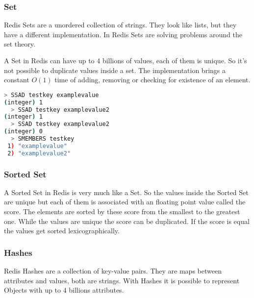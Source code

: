 \subsubsection{Set}
Redis Sets are a unordered collection of strings. They look like lists, but they have a different implementation. In Redis Sets are solving problems around the set theory.\cite{das2015learning} 

A Set in Redis can have up to 4 billions of values, each of them is unique. So it's not possible to duplicate values inside a set. The implementation brings a constant $O(1)$ time of adding, removing or checking for existence of an element.\cite{RedisSets}

\begin{lstlisting}[language=bash]
  > SSAD testkey examplevalue
(integer) 1
  > SSAD testkey examplevalue2
(integer) 1 
  > SSAD testkey examplevalue2
(integer) 0  
  > SMEMBERS testkey
 1) "examplevalue"
 2) "examplevalue2"
\end{lstlisting}

\subsubsection{Sorted Set}
A Sorted Set in Redis is very much like a Set. So the values inside the Sorted Set are unique but each of them is associated with an floating point value called the score. The elements are sorted by these score from the smallest to the greatest one. While the values are unique the score can be duplicated. If the score is equal the values get sorted lexicographically.\cite{RedisIntroDataTypes}

\subsubsection{Hashes}
Redis Hashes are a collection of key-value pairs. They are maps between attributes and values, both are strings. With Hashes it is possible to represent Objects with up to 4 billions attributes.\cite{RedisIntroDataTypes}
